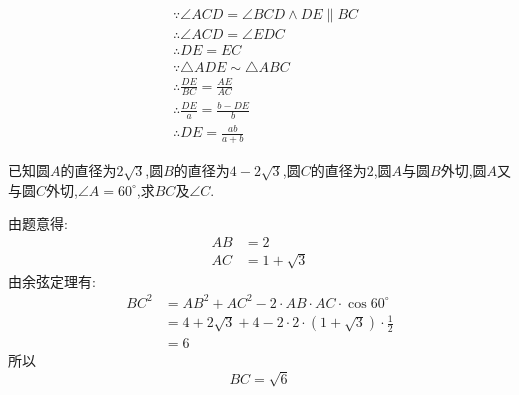 \begin{questions}
	\begin{solution}
		\begin{align*}
			 & \because \angle{ACD} = \angle{BCD} \land DE \parallel BC \\
			 & \therefore \angle{ACD}=\angle{EDC}                       \\
			 & \therefore DE = EC                                       \\
			 & \because \triangle{ADE} \sim \triangle{ABC}              \\
			 & \therefore \frac{DE}{BC} = \frac{AE}{AC}                 \\
			 & \therefore \frac{DE}{a} = \frac{b-DE}{b}                 \\
			 & \therefore DE = \frac{ab}{a+b}
		\end{align*}
	\end{solution}
	\question[10]
	已知圆$A$的直径为$2\sqrt{3}$,圆$B$的直径为$4-2\sqrt{3}$,圆$C$的直径为$2$,圆$A$与圆$B$外切,圆$A$又与圆$C$外切,$\angle{A}=60^\circ$,求$BC$及$\angle{C}$.

	\begin{solution}
		\begin{center}
		\end{center}
		由题意得:
		\begin{align*}
			AB & = 2            \\
			AC & = 1 + \sqrt{3}
		\end{align*}
		由余弦定理有:
		\begin{align*}
			BC^2 & = AB^2 + AC^2 - 2\cdot AB \cdot AC \cdot \cos60^\circ           \\
			     & = 4 + 2\sqrt{3} + 4 - 2\cdot 2 \cdot (1+\sqrt{3}) \cdot \frac12 \\
			     & = 6
		\end{align*}
		所以
		\begin{equation*}
			BC = \sqrt{6}
		\end{equation*}


\end{solution}
\end{questions}
